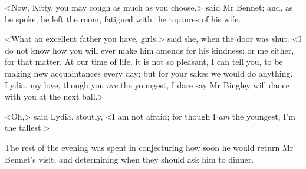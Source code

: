 <Now, Kitty, you may cough as much as you choose,> said Mr Bennet; and, as he spoke, he left the room, fatigued with the raptures of his wife.

<What an excellent father you have, girls,> said she, when the door was shut. <I do not know how you will ever make him amends for his kindness; or me either, for that matter. At our time of life, it is not so pleasant, I can tell you, to be making new acquaintances every day; but for your sakes we would do anything. Lydia, my love, though you \textit{are} the youngest, I dare say Mr Bingley will dance with you at the next ball.>

<Oh,> said Lydia, stoutly, <I am not afraid; for though I \textit{am} the youngest, I'm the tallest.>

The rest of the evening was spent in conjecturing how soon he would return Mr Bennet's visit, and determining when they should ask him to dinner.